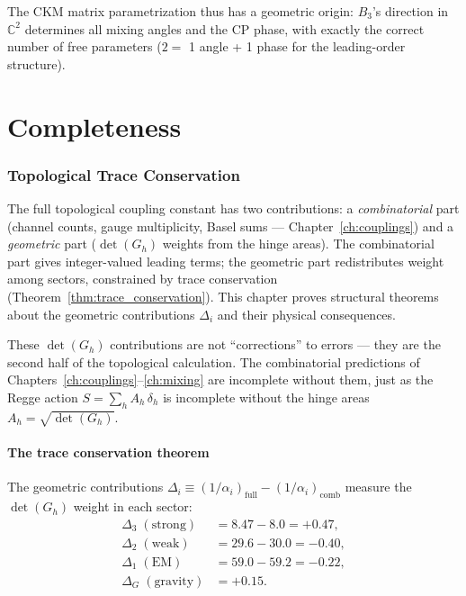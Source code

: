 \documentclass[12pt]{article}
\theoremstyle{remark}
\theoremstyle{definition}
\begin{document}
The CKM matrix parametrization thus has a geometric origin: $B_3$'s direction in $\mathbb{C}^2$ determines all mixing angles and the CP phase, with exactly the correct number of free parameters ($2 = $ 1 angle + 1 phase for the leading-order structure).


\part{Completeness}


\section{Topological Trace Conservation}
\label{ch:ghosts}

The full topological coupling constant has two contributions: a \emph{combinatorial} part (channel counts, gauge multiplicity, Basel sums --- Chapter~\ref{ch:couplings}) and a \emph{geometric} part ($\det(G_h)$ weights from the hinge areas). The combinatorial part gives integer-valued leading terms; the geometric part redistributes weight among sectors, constrained by trace conservation (Theorem~\ref{thm:trace_conservation}). This chapter proves structural theorems about the geometric contributions $\Delta_i$ and their physical consequences.

These $\det(G_h)$ contributions are not ``corrections'' to errors --- they are the second half of the topological calculation. The combinatorial predictions of Chapters~\ref{ch:couplings}--\ref{ch:mixing} are incomplete without them, just as the Regge action $S = \sum_h A_h\,\delta_h$ is incomplete without the hinge areas $A_h = \sqrt{\det(G_h)}$.

\subsection{The trace conservation theorem}

The geometric contributions $\Delta_i \equiv (1/\alpha_i)_\text{full} - (1/\alpha_i)_\text{comb}$ measure the $\det(G_h)$ weight in each sector:
\begin{align}
\Delta_3 \;(\text{strong}) &= 8.47 - 8.0 = +0.47, \\
\Delta_2 \;(\text{weak}) &= 29.6 - 30.0 = -0.40, \\
\Delta_1 \;(\text{EM}) &= 59.0 - 59.2 = -0.22, \\
\Delta_G \;(\text{gravity}) &= +0.15.
\end{align}
\end{document}
